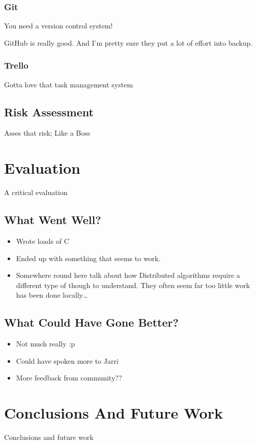 \documentclass[12pt]{report}
\begin{document}
\subsection{Git}
You need a version control system!

GitHub is really good. And I'm pretty sure they put a lot of effort into backup.

\subsection{Trello}
Gotta love that task management system

\section{Risk Assessment}
Asses that risk; Like a Boss

\chapter{Evaluation}
A critical evaluation

\section{What Went Well?}

\begin{itemize}
\item Wrote loads of C
\item Ended up with something that seems to work.
\item Somewhere round here talk about how Distributed algorithms require a
  different type of though to understand. They often seem far too little work
  has been done locally\ldots
\end{itemize}

\section{What Could Have Gone Better?}

\begin{itemize}
\item Not much really :p
\item Could have spoken more to Jarri
\item More feedback from community??
\end{itemize}

\chapter{Conclusions And Future Work}
Conclusions and future work
\end{document}

